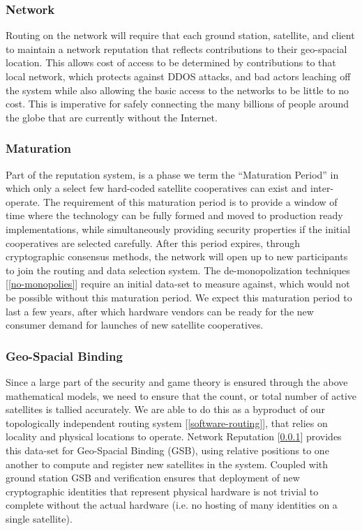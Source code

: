 \documentclass[11pt]{article}
\begin{document}
\subsubsection{Network}
\label{network-reputation}

Routing on the network will require that each ground station, satellite, and client to maintain a network reputation that reflects contributions to their geo-spacial location.
This allows cost of access to be determined by contributions to that local network, which protects against DDOS attacks, and bad actors leaching off the system while also allowing the basic access to the networks to be little to no cost.
This is imperative for safely connecting the many billions of people around the globe that are currently without the Internet.


\subsubsection{Maturation}

Part of the reputation system, is a phase we term the ``Maturation Period'' in which only a select few hard-coded satellite cooperatives can exist and inter-operate.
The requirement of this maturation period is to provide a window of time where the technology can be fully formed and moved to production ready implementations, while simultaneously providing security properties if the initial cooperatives are selected carefully.
After this period expires, through cryptographic consensus methods, the network will open up to new participants to join the routing and data selection system.
The de-monopolization techniques [\ref{no-monopolies}] require an initial data-set to measure against, which would not be possible without this maturation period.
We expect this maturation period to last a few years, after which hardware vendors can be ready for the new consumer demand for launches of new satellite cooperatives.


\subsubsection{Geo-Spacial Binding}

Since a large part of the security and game theory is ensured through the above mathematical models, we need to ensure that the count, or total number of active satellites is tallied accurately.
We are able to do this as a byproduct of our topologically independent routing system [\ref{software-routing}], that relies on locality and physical locations to operate.
Network Reputation [\ref{network-reputation}] provides this data-set for Geo-Spacial Binding (GSB), using relative positions to one another to compute and register new satellites in the system.
Coupled with ground station GSB and verification ensures that deployment of new cryptographic identities that represent physical hardware is not trivial to complete without the actual hardware (i.e. no hosting of many identities on a single satellite).
\end{document}
